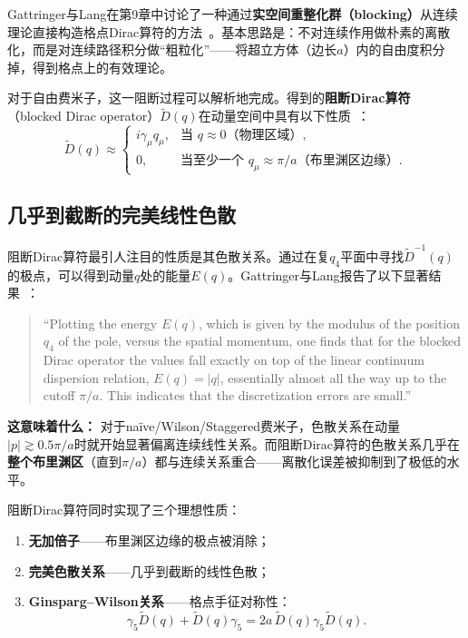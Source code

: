 \documentclass[12pt,a4paper]{ctexart}
\theoremstyle{definition}
\begin{document}
Gattringer与Lang在第9章中讨论了一种通过\textbf{实空间重整化群（blocking）}从连续理论直接构造格点Dirac算符的方法~\cite{GattringerLang2010}。基本思路是：不对连续作用做朴素的离散化，而是对连续路径积分做``粗粒化''——将超立方体（边长$a$）内的自由度积分掉，得到格点上的有效理论。

对于自由费米子，这一阻断过程可以解析地完成。得到的\textbf{阻断Dirac算符}（blocked Dirac operator）$\tilde{D}(q)$在动量空间中具有以下性质~\cite{GattringerLang2010}：
\begin{equation}\label{eq:blocked_ideal}
    \tilde{D}(q) \approx \begin{cases}
        i\gamma_\mu q_\mu, & \text{当 } q \approx 0 \text{（物理区域）},\\
        0, & \text{当至少一个 } q_\mu \approx \pi/a \text{（布里渊区边缘）}.
    \end{cases}
\end{equation}

\subsection{几乎到截断的完美线性色散}

阻断Dirac算符最引人注目的性质是其色散关系。通过在复$q_4$平面中寻找$\tilde{D}^{-1}(q)$的极点，可以得到动量$q$处的能量$E(q)$。Gattringer与Lang报告了以下显著结果~\cite{GattringerLang2010}：
\begin{quote}
``Plotting the energy $E(q)$, which is given by the modulus of the position $q_4$ of the pole, versus the spatial momentum, one finds that for the blocked Dirac operator the values fall exactly on top of the linear continuum dispersion relation, $E(q) = |q|$, essentially almost all the way up to the cutoff $\pi/a$. This indicates that the discretization errors are small.''
\end{quote}

\textbf{这意味着什么：} 对于na\"ive/Wilson/Staggered费米子，色散关系在动量$|p| \gtrsim 0.5\pi/a$时就开始显著偏离连续线性关系。而阻断Dirac算符的色散关系几乎在\textbf{整个布里渊区}（直到$\pi/a$）都与连续关系重合——离散化误差被抑制到了极低的水平。

阻断Dirac算符同时实现了三个理想性质：
\begin{enumerate}[leftmargin=*]
    \item \textbf{无加倍子}——布里渊区边缘的极点被消除；
    \item \textbf{完美色散关系}——几乎到截断的线性色散；
    \item \textbf{Ginsparg--Wilson关系}——格点手征对称性：
    \begin{equation}
        \gamma_5 \tilde{D}(q) + \tilde{D}(q)\gamma_5 = 2a\,\tilde{D}(q)\gamma_5\tilde{D}(q).
    \end{equation}
\end{enumerate}
\end{document}
